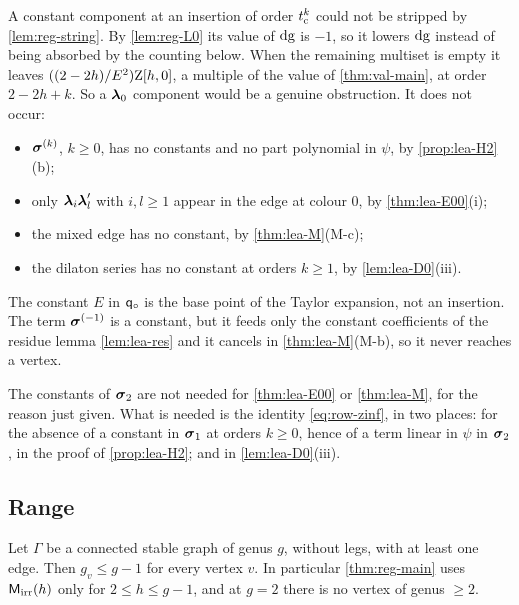 \begin{rmk}[Absence of $\lf_0$]
\label{rmk:reg-nol0}
A constant component at an insertion of order $t_{\mathrm{c}}^k$ could not be stripped by \cref{lem:reg-string}. By \cref{lem:reg-L0} its value of $\mathrm{dg}$ is $-1$, so it lowers $\mathrm{dg}$ instead of being absorbed by the counting below. When the remaining multiset is empty it leaves $((2-2h)/E^2)\mathrm{Z}[h,0]$, a multiple of the value of \cref{thm:val-main}, at order $2-2h+k$. So a $\lf_0$ component would be a genuine obstruction. It does not occur:
\begin{itemize}
\item $\boldsymbol{\sigma}^{(k)}$, $k\geq 0$, has no constants and no part polynomial in $\psi$, by \cref{prop:lea-H2}(b);
\item only $\boldsymbol{\lambda}_i\boldsymbol{\lambda}_l'$ with $i,l\geq 1$ appear in the edge at colour $0$, by \cref{thm:lea-E00}(i);
\item the mixed edge has no constant, by \cref{thm:lea-M}(M-c);
\item the dilaton series has no constant at orders $k\geq 1$, by \cref{lem:lea-D0}(iii).
\end{itemize}
The constant $E$ in $\mathsf{q}_{\circ}$ is the base point of the Taylor expansion, not an insertion. The term $\boldsymbol{\sigma}^{(-1)}$ is a constant, but it feeds only the constant coefficients of the residue lemma \cref{lem:lea-res} and it cancels in \cref{thm:lea-M}(M-b), so it never reaches a vertex.

The constants of $\boldsymbol{\sigma}_2$ are not needed for \cref{thm:lea-E00} or \cref{thm:lea-M}, for the reason just given. What is needed is the identity \cref{eq:row-zinf}, in two places: for the absence of a constant in $\boldsymbol{\sigma}_1$ at orders $k\geq 0$, hence of a term linear in $\psi$ in $\boldsymbol{\sigma}_2$, in the proof of \cref{prop:lea-H2}; and in \cref{lem:lea-D0}(iii).
\end{rmk}

\subsection{Range}

\begin{lem}[Range]
\label{lem:reg-range}
Let $\Gamma$ be a connected stable graph of genus $g$, without legs, with at least one edge. Then $g_{v}\leq g-1$ for every vertex $v$. In particular \cref{thm:reg-main} uses $\mathsf{M}_{\mathrm{irr}}(h)$ only for $2\leq h\leq g-1$, and at $g=2$ there is no vertex of genus $\geq 2$.
\end{lem}

